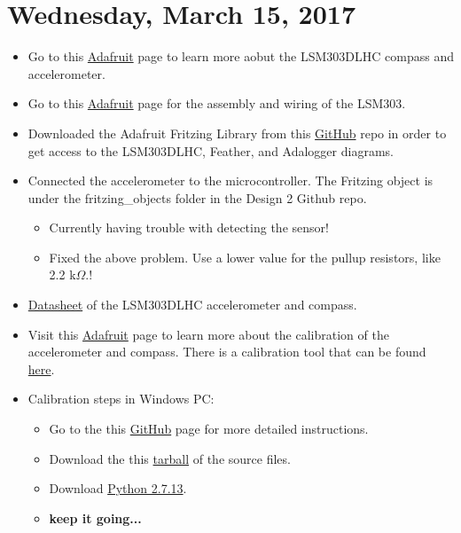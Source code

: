 \documentclass[12pt]{article}
\begin{document}
\section{Wednesday, March 15, 2017}
\begin{itemize}
\item Go to this \href{https://www.adafruit.com/product/1120}{Adafruit} page to learn more aobut the LSM303DLHC compass and accelerometer.
\item Go to this \href{https://learn.adafruit.com/lsm303-accelerometer-slash-compass-breakout/assembly-and-wiring}{Adafruit} page for the assembly and wiring of the LSM303.
\item Downloaded the Adafruit Fritzing Library from this \href{https://github.com/adafruit/Fritzing-Library}{GitHub} repo in order to get access to the LSM303DLHC, Feather, and Adalogger diagrams.
\item Connected the accelerometer to the microcontroller. The Fritzing object is under the \textsf{fritzing\_objects} folder in the Design 2 Github repo.
	\begin{itemize}
	\item Currently having trouble with detecting the sensor!
	\item Fixed the above problem. Use a lower value for the pullup resistors, like 2.2 k$\Omega$.!
	\end{itemize}
\item \href{https://cdn-shop.adafruit.com/datasheets/LSM303DLHC.PDF}{Datasheet} of the LSM303DLHC accelerometer and compass.
\item Visit this \href{https://learn.adafruit.com/lsm303-accelerometer-slash-compass-breakout/calibration}{Adafruit} page to learn more about the calibration of the accelerometer and compass. There is a calibration tool that can be found \href{http://www.varesano.net/blog/fabio/freeimu-magnetometer-and-accelerometer-calibration-gui-alpha-version-out}{here}.
\item Calibration steps in Windows PC:
	\begin{itemize}
	\item Go to the this \href{https://github.com/mjs513/FreeIMU-Updates/wiki/04.-FreeIMU-Calibration}{GitHub} page for more detailed instructions.
	\item Download the this \href{http://bazaar.launchpad.net/~fabio-varesano/freeimu/trunk/tarball/49?start_revid=49}{tarball} of the source files.
	\item Download \href{https://www.python.org/ftp/python/2.7.13/python-2.7.13.msi}{Python 2.7.13}.
	\item \textbf{keep it going...}
	\end{itemize}
\end{itemize}
\end{document}

